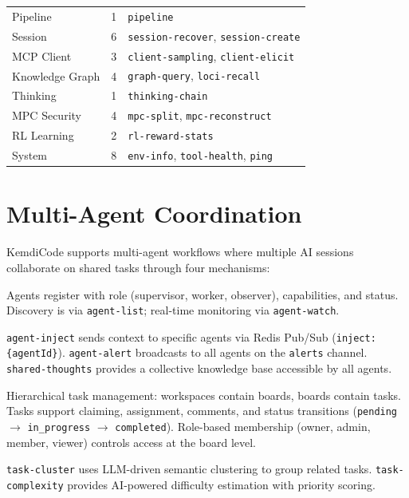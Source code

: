 \documentclass[journal,10pt]{IEEEtran}
\newcommand{\code}[1]{\texttt{#1}}
\begin{document}
\begin{table}[!t]
\begin{tabular}{@{}lcp{28mm}@{}}
Pipeline          & 1  & \code{pipeline} \\
Session           & 6  & \code{session-recover}, \code{session-create} \\
MCP Client        & 3  & \code{client-sampling}, \code{client-elicit} \\
Knowledge Graph   & 4  & \code{graph-query}, \code{loci-recall} \\
Thinking          & 1  & \code{thinking-chain} \\
MPC Security      & 4  & \code{mpc-split}, \code{mpc-reconstruct} \\
RL Learning       & 2  & \code{rl-reward-stats} \\
System            & 8  & \code{env-info}, \code{tool-health}, \code{ping} \\
\bottomrule
\end{tabular}
\end{table}

\section{Multi-Agent Coordination}
\label{sec:multiagent}

KemdiCode supports multi-agent workflows where multiple AI sessions collaborate on shared tasks through four mechanisms:

\begin{description}[nosep,style=unboxed,leftmargin=0pt,font=\normalfont\itshape]
\item[Agent Registry.] Agents register with role (supervisor, worker, observer), capabilities, and status. Discovery is via \code{agent-list}; real-time monitoring via \code{agent-watch}.

\item[Message Passing.] \code{agent-inject} sends context to specific agents via Redis Pub/Sub (\code{inject:\{agentId\}}). \code{agent-alert} broadcasts to all agents on the \code{alerts} channel. \code{shared-thoughts} provides a collective knowledge base accessible by all agents.

\item[Kanban System.] Hierarchical task management: workspaces contain boards, boards contain tasks. Tasks support claiming, assignment, comments, and status transitions (\code{pending} $\to$ \code{in\_progress} $\to$ \code{completed}). Role-based membership (owner, admin, member, viewer) controls access at the board level.

\item[Task Intelligence.] \code{task-cluster} uses LLM-driven semantic clustering to group related tasks. \code{task-complexity} provides AI-powered difficulty estimation with priority scoring.
\end{description}
\end{document}
